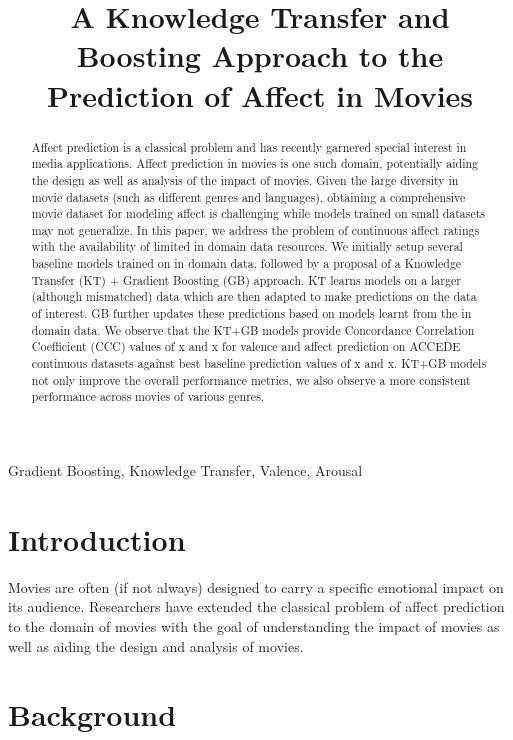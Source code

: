 \documentclass{article}
\title{A Knowledge Transfer and Boosting Approach to the Prediction of Affect in Movies}
\begin{document}
\ninept
%
\maketitle
%
\begin{abstract}
Affect prediction is a classical problem and has recently garnered special interest in media applications. 
Affect prediction in movies is one such domain, potentially aiding the design as well as analysis of the impact of movies.
Given the large diversity in movie datasets (such as different genres and languages), obtaining a comprehensive movie dataset for modeling affect is challenging while models trained on small datasets may not generalize. 
In this paper, we address the problem of continuous affect ratings with the availability of limited in domain data resources. 
We initially setup several baseline models trained on in domain data, followed by a proposal of a Knowledge Transfer (KT) + Gradient Boosting (GB) approach.
KT learns models on a larger (although mismatched) data which are then adapted to make predictions on the data of interest. 
GB further updates these predictions based on models learnt from the in domain data.
We observe that the KT+GB models provide Concordance Correlation Coefficient (CCC) values of x and x for valence and affect prediction on ACCEDE continuous datasets against best baseline prediction values of x and x. 
KT+GB models not only improve the overall performance metrics, we also observe a more consistent performance across movies of various genres. 
 
\end{abstract}
%
\begin{keywords}
Gradient Boosting, Knowledge Transfer, Valence, Arousal
\end{keywords}
%
\section{Introduction}
\label{sec:intro}
Movies are often (if not always) designed to carry a specific emotional impact on its audience.
Researchers have extended the classical problem of affect prediction to the domain of movies with the goal of understanding the impact of movies as well as aiding the design and analysis of movies. 



\section{Background}
\end{document}
